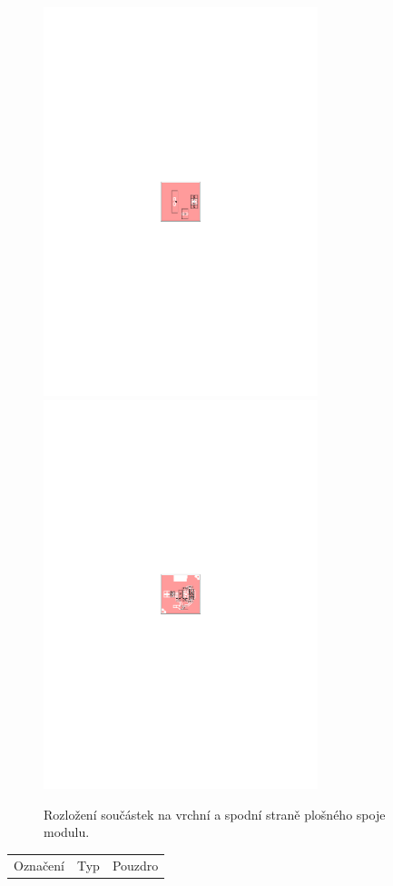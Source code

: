 \documentclass[12pt,a4paper,oneside]{article}
\begin{document}
\begin{figure} [htbp]
  \includegraphics[trim = 85mm 132mm 85mm 132mm, clip, width=8cm]{../../CAM_DOC/O1.pdf}
  \includegraphics[trim = 85mm 132mm 85mm 132mm, clip, width=8cm]{../../CAM_DOC/O2.pdf}
  \caption{Rozložení součástek na vrchní a spodní straně plošného spoje modulu.}
\end{figure}

\begin{tabular}{ccc}
Označení & Typ & Pouzdro\\ 

\end{tabular} 
\end{document}
